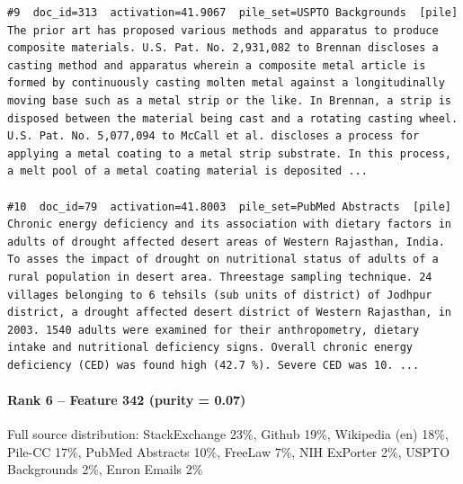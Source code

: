 \begin{verbatim}
#9  doc_id=313  activation=41.9067  pile_set=USPTO Backgrounds  [pile]
The prior art has proposed various methods and apparatus to produce composite materials. U.S. Pat. No. 2,931,082 to Brennan discloses a casting method and apparatus wherein a composite metal article is formed by continuously casting molten metal against a longitudinally moving base such as a metal strip or the like. In Brennan, a strip is disposed between the material being cast and a rotating casting wheel.
U.S. Pat. No. 5,077,094 to McCall et al. discloses a process for applying a metal coating to a metal strip substrate. In this process, a melt pool of a metal coating material is deposited ...

#10  doc_id=79  activation=41.8003  pile_set=PubMed Abstracts  [pile]
Chronic energy deficiency and its association with dietary factors in adults of drought affected desert areas of Western Rajasthan, India.
To asses the impact of drought on nutritional status of adults of a rural population in desert area. Threestage sampling technique. 24 villages belonging to 6 tehsils (sub units of district) of Jodhpur district, a drought affected desert district of Western Rajasthan, in 2003. 1540 adults were examined for their anthropometry, dietary intake and nutritional deficiency signs. Overall chronic energy deficiency (CED) was found high (42.7 %). Severe CED was 10. ...

\end{verbatim}

\paragraph*{Rank 6 -- Feature 342 (purity = 0.07)}

Full source distribution: StackExchange 23\%, Github 19\%, Wikipedia (en) 18\%, Pile-CC 17\%, PubMed Abstracts 10\%, FreeLaw 7\%, NIH ExPorter 2\%, USPTO Backgrounds 2\%, Enron Emails 2\%

